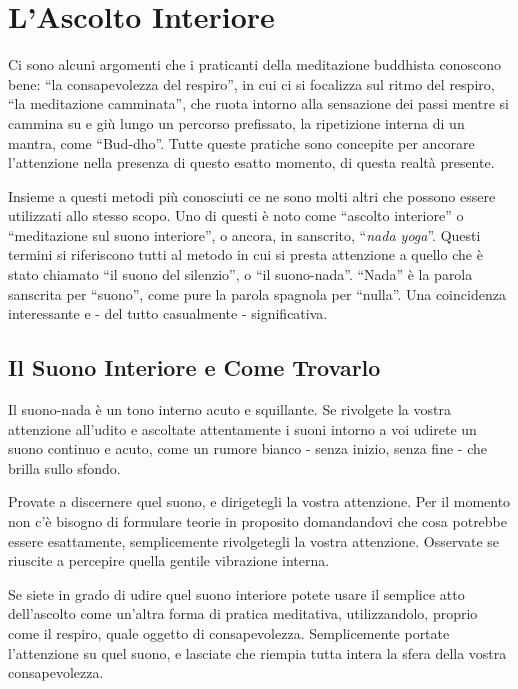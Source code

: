 \chapter{L'Ascolto Interiore}

Ci sono alcuni argomenti che i praticanti della meditazione buddhista
conoscono bene: ``la consapevolezza del respiro'', in cui ci si
focalizza sul ritmo del respiro, ``la meditazione camminata'', che ruota
intorno alla sensazione dei passi mentre si cammina su e giù lungo un
percorso prefissato, la ripetizione interna di un mantra, come
``Bud-dho''. Tutte queste pratiche sono concepite per ancorare
l'attenzione nella presenza di questo esatto momento, di questa realtà
presente.

Insieme a questi metodi più conosciuti ce ne sono molti altri che
possono essere utilizzati allo stesso scopo. Uno di questi è noto come
``ascolto interiore'' o ``meditazione sul suono interiore'', o ancora,
in sanscrito, ``\emph{nada yoga}''. Questi termini si riferiscono tutti
al metodo in cui si presta attenzione a quello che è stato chiamato ``il
suono del silenzio'', o ``il suono-nada''. ``Nada'' è la parola
sanscrita per ``suono'', come pure la parola spagnola per ``nulla''. Una
coincidenza interessante e - del tutto casualmente - significativa.

\section{Il Suono Interiore e Come Trovarlo}

Il suono-nada è un tono interno acuto e squillante. Se rivolgete la
vostra attenzione all'udito e ascoltate attentamente i suoni intorno a
voi udirete un suono continuo e acuto, come un rumore bianco - senza
inizio, senza fine - che brilla sullo sfondo.

Provate a discernere quel suono, e dirigetegli la vostra attenzione. Per
il momento non c'è bisogno di formulare teorie in proposito domandandovi
che cosa potrebbe essere esattamente, semplicemente rivolgetegli la
vostra attenzione. Osservate se riuscite a percepire quella gentile
vibrazione interna.

Se siete in grado di udire quel suono interiore potete usare il semplice
atto dell'ascolto come un'altra forma di pratica meditativa,
utilizzandolo, proprio come il respiro, quale oggetto di consapevolezza.
Semplicemente portate l'attenzione su quel suono, e lasciate che riempia
tutta intera la sfera della vostra consapevolezza.


